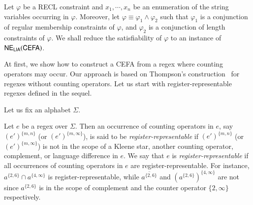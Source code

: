 Let $\varphi$ be a RECL constraint and $x_1, \cdots, x_n$ be an enumeration of the string variables occurring in $\varphi$. Moreover, let $\varphi \equiv \varphi_1 \wedge \varphi_2$ such that $\varphi_1$ is a conjunction of regular membership constraints of $\varphi$, and $\varphi_2$ is a conjunction of length constraints of $\varphi$.
We shall reduce the satisfiability of $\varphi$ to an instance of ${\sf NE_{LIA}(CEFA)}$. 

At first, we show how to construct a CEFA from a regex where counting operators may occur. Our approach is based on Thompson's construction~\cite{Thompson1968} for regexes without counting operators. Let us start with register-representable regexes defined in the sequel. 

Let us fix an alphabet $\Sigma$.

Let $e$ be a regex over $\Sigma$. Then an occurrence of counting operators in $e$, say $(e')^{\{m,n\}}$ (or $(e')^{\{m, \infty\}}$), is said to be \emph{register-representable} if $(e')^{\{m,n\}}$ (or $(e')^{\{m, \infty\}}$) is not in the scope of a Kleene star, another counting operator, complement, or language difference in $e$. We say that $e$ is \emph{register-representable} if all occurrences of counting operators in $e$ are register-representable. For instance, $a^{\{2, 6\}} \cap a^{\{4, \infty\}}$ is register-representable, while $\overline{a^{\{2, 6\}}}$ and $(a^{\{2, 6\}})^{\{4,\infty\}}$ are not since $a^{\{2,6\}}$ is in the scope of complement and the counter operator $\{2, \infty\}$ respectively.  

